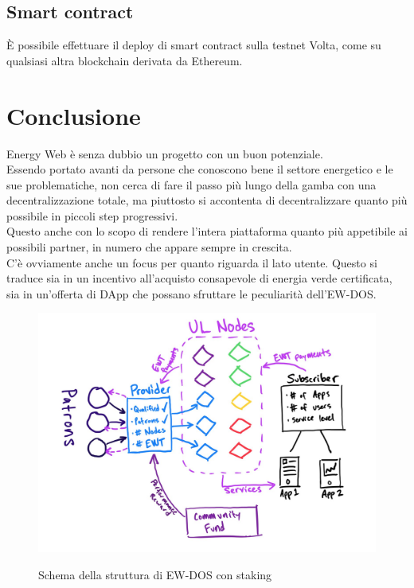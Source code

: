 \documentclass[12pt, letterpaper, twoside]{article}
\begin{document}
\subsection{Smart contract}
È possibile effettuare il deploy di smart contract sulla testnet Volta, come su qualsiasi altra blockchain derivata da Ethereum.

\newpage

\section{Conclusione}
Energy Web è senza dubbio un progetto con un buon potenziale. \\
Essendo portato avanti da persone che conoscono bene il settore energetico e le sue problematiche, non cerca di fare il passo più lungo della gamba con una decentralizzazione totale, ma piuttosto si accontenta di decentralizzare quanto più possibile in piccoli step progressivi. \\
Questo anche con lo scopo di rendere l'intera piattaforma quanto più appetibile ai possibili partner, in numero che appare sempre in crescita. \\
C'è ovviamente anche un focus per quanto riguarda il lato utente.
Questo si traduce sia in un incentivo all'acquisto consapevole di energia verde certificata, sia in un'offerta di DApp che possano sfruttare le peculiarità dell'EW-DOS.

\begin{figure}[h]
    \includegraphics[width=13cm]{ew-staking.png}
    \centering
    \label{ew-staking}
    \caption{Schema della struttura di EW-DOS con staking \cite{art:ew-staking}}
\end{figure}

\newpage

\printbibliography
\end{document}
